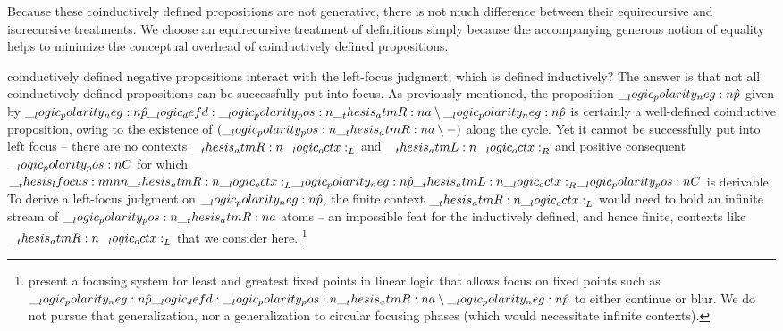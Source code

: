 Because these coinductively defined propositions are not generative, there is not much difference between their equirecursive and isorecursive treatments.\autocite{Amadio+Cardelli:TOPLAS93}
We choose an equirecursive treatment of definitions simply because the accompanying generous notion of equality helps to minimize the conceptual overhead of coinductively defined propositions.

 coinductively defined negative propositions interact with the left-focus judgment, which is defined inductively?
The answer is that not all coinductively defined propositions can be successfully put into focus.
As previously mentioned, the proposition $\__logic_polarity_neg:n {\hat{p}}$ given by $\__logic_polarity_neg:n {\hat{p}} \__logic_defd: \__logic_polarity_pos:n {\__thesis_atmR:n {a}} \mathbin { \setminus } \__logic_polarity_neg:n {\hat{p}}$ is certainly a well-defined coinductive proposition, owing to the existence of $(\__logic_polarity_pos:n {\__thesis_atmR:n {a}} \mathbin { \setminus } \mathord{-})$ along the cycle.
Yet it cannot be successfully put into left focus -- there are no contexts $\__thesis_atmR:n {\__logic_octx:}_L$ and $\__thesis_atmL:n {\__logic_octx:}_R$ and positive consequent $\__logic_polarity_pos:n {C}$ for which $\__thesis_lfocus:nnnn {\__thesis_atmR:n {\__logic_octx:}_L} {\__logic_polarity_neg:n {\hat{p}}} {\__thesis_atmL:n {\__logic_octx:}_R} {\__logic_polarity_pos:n {C}}$ is derivable.
To derive a left-focus judgment on $\__logic_polarity_neg:n {\hat{p}}$, the finite context $\__thesis_atmR:n {\__logic_octx:}_L$ would need to hold an infinite stream of $\__logic_polarity_pos:n {\__thesis_atmR:n {a}}$ atoms -- an impossible feat for the inductively defined, and hence finite, contexts like $\__thesis_atmR:n {\__logic_octx:}_L$ that we consider here.%
\footnote{%
  \Textcite{Baelde+Miller:LPAR07} present a focusing system for least and greatest fixed points in linear logic that allows focus on fixed points such as $\__logic_polarity_neg:n {\hat{p}} \__logic_defd: \__logic_polarity_pos:n {\__thesis_atmR:n {a}} \mathbin { \setminus } \__logic_polarity_neg:n {\hat{p}}$ to either continue or blur.
  We do not pursue that generalization, nor a generalization to circular focusing phases (which would necessitate infinite contexts).}


